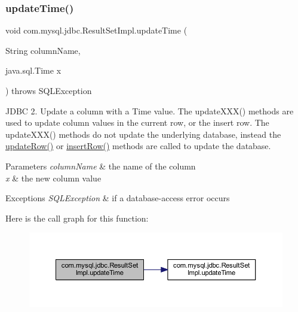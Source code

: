 \subsubsection{\texorpdfstring{update\+Time()}{updateTime()}\hspace{0.1cm}{\footnotesize\ttfamily [2/2]}}
{\footnotesize\ttfamily void com.\+mysql.\+jdbc.\+Result\+Set\+Impl.\+update\+Time (\begin{DoxyParamCaption}\item[{String}]{column\+Name,  }\item[{java.\+sql.\+Time}]{x }\end{DoxyParamCaption}) throws S\+Q\+L\+Exception}

J\+D\+BC 2. Update a column with a Time value. The update\+X\+X\+X() methods are used to update column values in the current row, or the insert row. The update\+X\+X\+X() methods do not update the underlying database, instead the \mbox{\hyperlink{classcom_1_1mysql_1_1jdbc_1_1_result_set_impl_a2842d32292d023aaeeafedeed3322981}{update\+Row()}} or \mbox{\hyperlink{classcom_1_1mysql_1_1jdbc_1_1_result_set_impl_a78e304e3279cbcf60392f18c1385e3bf}{insert\+Row()}} methods are called to update the database.


\begin{DoxyParams}{Parameters}
{\em column\+Name} & the name of the column \\
\hline
{\em x} & the new column value\\
\hline
\end{DoxyParams}

\begin{DoxyExceptions}{Exceptions}
{\em S\+Q\+L\+Exception} & if a database-\/access error occurs \\
\hline
\end{DoxyExceptions}
Here is the call graph for this function\+:
\nopagebreak
\begin{figure}[H]
\begin{center}
\leavevmode
\includegraphics[width=350pt]{classcom_1_1mysql_1_1jdbc_1_1_result_set_impl_a8a8d7908d50f7158ffc333b118a019eb_cgraph}
\end{center}
\end{figure}
\mbox{\label{classcom_1_1mysql_1_1jdbc_1_1_result_set_impl_a37a19594b5873238ea66b6549024e202}} 

